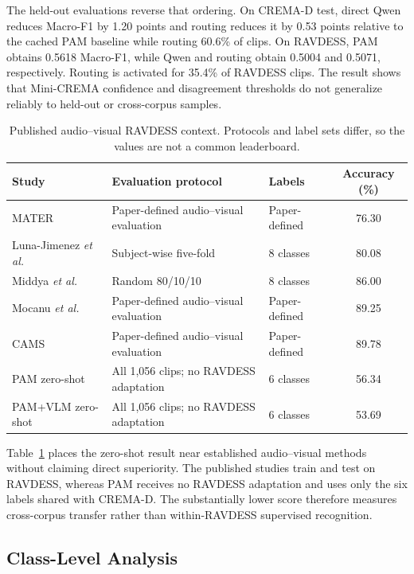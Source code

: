 \documentclass[conference]{IEEEtran}
\begin{document}
The held-out evaluations reverse that ordering. On CREMA-D test, direct Qwen
reduces Macro-F1 by 1.20 points and routing reduces it by 0.53 points relative
to the cached PAM baseline while routing 60.6\% of clips. On RAVDESS, PAM
obtains 0.5618 Macro-F1, while Qwen and routing obtain 0.5004 and 0.5071,
respectively. Routing is activated for 35.4\% of RAVDESS clips. The result
shows that Mini-CREMA confidence and disagreement thresholds do not generalize
reliably to held-out or cross-corpus samples.

\begin{table}[t]
\centering
\caption{Published audio--visual RAVDESS context. Protocols and label sets
differ, so the values are not a common leaderboard.}
\label{tab:ravdess}
\small
\setlength{\tabcolsep}{8pt}
\begin{tabular}{@{}lllc@{}}
\toprule
\textbf{Study} & \textbf{Evaluation protocol} & \textbf{Labels}
& \textbf{Accuracy (\%)} \\
\midrule
MATER~\cite{ghaleb2023mater}
  & Paper-defined audio--visual evaluation & Paper-defined & 76.30 \\
Luna-Jimenez \emph{et al.}~\cite{lunajimenez2021ravdess}
  & Subject-wise five-fold & 8 classes & 80.08 \\
Middya \emph{et al.}~\cite{middya2022fusion}
  & Random 80/10/10 & 8 classes & 86.00 \\
Mocanu \emph{et al.}~\cite{mocanu2023crossmodal}
  & Paper-defined audio--visual evaluation & Paper-defined & 89.25 \\
CAMS~\cite{lei2026cams}
  & Paper-defined audio--visual evaluation & Paper-defined & 89.78 \\
\midrule
PAM zero-shot
  & All 1,056 clips; no RAVDESS adaptation & 6 classes & 56.34 \\
PAM+VLM zero-shot
  & All 1,056 clips; no RAVDESS adaptation & 6 classes & 53.69 \\
\bottomrule
\end{tabular}
\end{table}

Table~\ref{tab:ravdess} places the zero-shot result near established
audio--visual methods without claiming direct superiority. The published
studies train and test on RAVDESS, whereas PAM receives no RAVDESS
adaptation and uses only the six labels shared with CREMA-D. The substantially
lower score therefore measures cross-corpus transfer rather than
within-RAVDESS supervised recognition.

\subsection{Class-Level Analysis}
\end{document}
